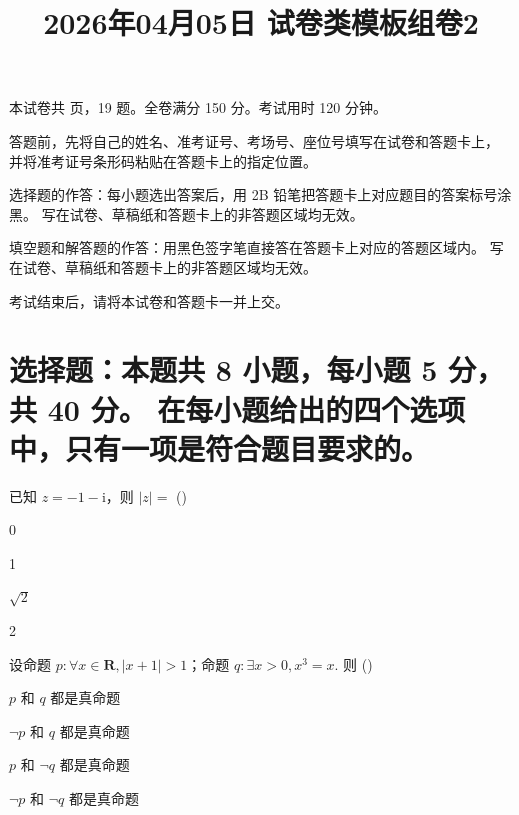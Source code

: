 \documentclass{exam-zh}
\title{2026年04月05日 试卷类模板组卷2}
\begin{document}

\secret

\maketitle
\begin{center}
    本试卷共 \pageref{LastPage} 页，19 题。全卷满分 150 分。考试用时 120 分钟。
\end{center}


\begin{notice}
  \item 答题前，先将自己的姓名、准考证号、考场号、座位号填写在试卷和答题卡上，
    并将准考证号条形码粘贴在答题卡上的指定位置。
  \item 选择题的作答：每小题选出答案后，用 2B 铅笔把答题卡上对应题目的答案标号涂黑。
    写在试卷、草稿纸和答题卡上的非答题区域均无效。
  \item 填空题和解答题的作答：用黑色签字笔直接答在答题卡上对应的答题区域内。
    写在试卷、草稿纸和答题卡上的非答题区域均无效。
  \item 考试结束后，请将本试卷和答题卡一并上交。
\end{notice}



\section{
  选择题：本题共 8 小题，每小题 5 分，共 40 分。
  在每小题给出的四个选项中，只有一项是符合题目要求的。
}

\begin{question}
已知 $z=-1-\mathrm{i}$，则 $|z|=$
(\hspace{1cm})
\begin{choices}
\item 0
\item 1
\item $\sqrt{2}$
\item 2
\end{choices}
\end{question}

\begin{question}
设命题 $p: \forall x\in\mathbf{R}, |x+1|>1$；命题 $q: \exists x>0, x^3=x$. 则
(\hspace{1cm})
\begin{choices}
\item $p$ 和 $q$ 都是真命题
\item $\neg p$ 和 $q$ 都是真命题
\item $p$ 和 $\neg q$ 都是真命题
\item $\neg p$ 和 $\neg q$ 都是真命题
\end{choices}
\end{question}
\end{document}
